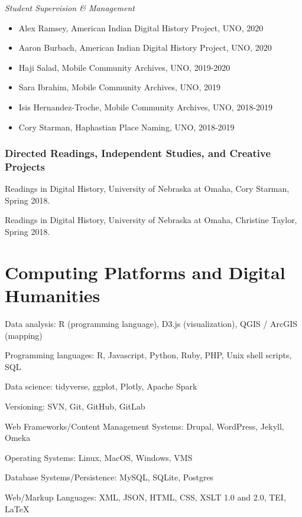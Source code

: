 \emph{Student Supervision \& Management}

\begin{itemize}
\tightlist
\item
  Alex Ramsey, American Indian Digital History Project, UNO, 2020
\item
  Aaron Burbach, American Indian Digital History Project, UNO, 2020
\item
  Haji Salad, Mobile Community Archives, UNO, 2019-2020
\item
  Sara Ibrahim, Mobile Community Archives, UNO, 2019
\item
  Isis Hernandez-Troche, Mobile Community Archives, UNO, 2018-2019
\item
  Cory Starman, Haphastian Place Naming, UNO, 2018-2019
\end{itemize}

\subsubsection{Directed Readings, Independent Studies, and Creative
Projects}\label{directed-readings-independent-studies-and-creative-projects}

Readings in Digital History, University of Nebraska at Omaha, Cory
Starman, Spring 2018.

Readings in Digital History, University of Nebraska at Omaha, Christine
Taylor, Spring 2018.

\section{Computing Platforms and Digital
Humanities}\label{computing-platforms-and-digital-humanities}

Data analysis: R (programming language), D3.js (visualization), QGIS /
ArcGIS (mapping)

Programming languages: R, Javascript, Python, Ruby, PHP, Unix shell
scripts, SQL

Data science: tidyverse, ggplot, Plotly, Apache Spark

Versioning: SVN, Git, GitHub, GitLab

Web Frameworks/Content Management Systems: Drupal, WordPress, Jekyll,
Omeka

Operating Systems: Linux, MacOS, Windows, VMS

Database Systems/Persistence: MySQL, SQLite, Postgres

Web/Markup Languages: XML, JSON, HTML, CSS, XSLT 1.0 and 2.0, TEI,
\LaTeX

